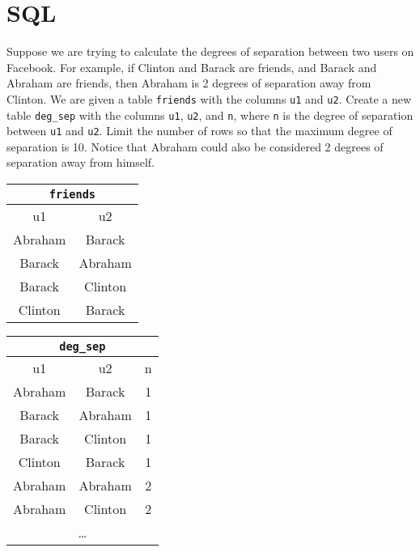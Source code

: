 \clearpage

\section{SQL}
\begin{questions}
\question
Suppose we are trying to calculate the degrees of separation between two users on Facebook. For example, if Clinton and Barack are friends, and Barack and Abraham are friends, then Abraham is 2 degrees of separation away from Clinton. We are given a table \texttt{friends} with the columns \texttt{u1} and \texttt{u2}. Create a new table \texttt{deg\_sep} with the columns \texttt{u1}, \texttt{u2}, and \texttt{n}, where \texttt{n} is the degree of separation between \texttt{u1} and \texttt{u2}. Limit the number of rows so that the maximum degree of separation is 10. Notice that Abraham could also be considered 2 degrees of separation away from himself.

\begin{minipage}{0.5\textwidth}
\begin{tabular}{|c|c|}
\hline
\multicolumn{2}{|c|}{\texttt{\textbf{friends}}} \\ \hline
u1 & u2 \\ \hline \hline
Abraham & Barack \\ \hline
Barack & Abraham \\ \hline
Barack & Clinton \\ \hline
Clinton & Barack \\ \hline
\end{tabular}
\end{minipage}
\begin{minipage}{0.5\textwidth}
\begin{tabular}{|c|c|c|}
\hline
\multicolumn{3}{|c|}{\textbf{\texttt{deg\_sep}}} \\ \hline
u1 & u2 & n \\ \hline \hline
Abraham & Barack & 1 \\ \hline
Barack & Abraham & 1 \\ \hline
Barack & Clinton & 1 \\ \hline
Clinton & Barack & 1 \\ \hline
Abraham & Abraham & 2 \\ \hline
Abraham & Clinton & 2 \\ \hline
\multicolumn{3}{|c|}{\dots} \\ \hline
\end{tabular}
\end{minipage}


\end{questions}

